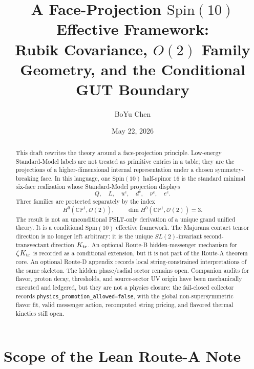 \documentclass[
  aps,
  prd,
  preprint,
  nofootinbib,
  superscriptaddress,
  longbibliography
]{revtex4-2}
\newcommand{\Spin}{\mathrm{Spin}}
\newcommand{\CP}{\mathbb{CP}}
\newcommand{\cO}{\mathcal{O}}
\begin{document}
\title{\texorpdfstring{A Face-Projection \(\Spin(10)\) Effective Framework:\\
Rubik Covariance, \(O(2)\) Family Geometry, and the Conditional GUT Boundary}
{A Face-Projection Spin(10) Effective Framework: Rubik Covariance, O(2) Family Geometry, and the Conditional GUT Boundary}}
\author{BoYu Chen}
\date{May 22, 2026}

\begin{abstract}
This draft rewrites the theory around a face-projection principle.  Low-energy
Standard-Model labels are not treated as primitive entries in a table; they are
the projections of a higher-dimensional internal representation under a chosen
symmetry-breaking face.  In this language, one \(\Spin(10)\) half-spinor
\(16\) is the standard minimal six-face realization whose Standard-Model
projection displays
\[
  Q,\quad L,\quad u^c,\quad d^c,\quad \nu^c,\quad e^c .
\]
Three families are protected separately by the index
\[
  H^0(\CP^1,\cO(2)),\qquad \dim H^0(\CP^1,\cO(2))=3 .
\]
The result is not an unconditional PSLT-only derivation of a unique grand
unified theory.  It is a conditional \(\Spin(10)\) effective framework.  The
Majorana contact tensor direction is no longer left arbitrary: it is the unique
\(SL(2)\)-invariant second-transvectant direction \(K_{\rm tr}\).  An optional
Route-B hidden-messenger mechanism for \(\zeta K_{\rm tr}\) is recorded as a
conditional extension, but it is not part of the Route-A theorem core.  An
optional Route-D appendix records local string-constrained interpretations of
the same skeleton.  The hidden phase/radial sector remains open.  Companion
audits for flavor, proton decay, thresholds, and source-sector UV origin have
been mechanically executed and ledgered, but they are not a physics closure:
the fail-closed collector records
\texttt{physics\_promotion\_allowed=false}, with the global
non-supersymmetric flavor fit, valid messenger action, recomputed string
pricing, and flavored thermal kinetics still open.
\end{abstract}

\maketitle

\section{Scope of the Lean Route-A Note}
\end{document}
